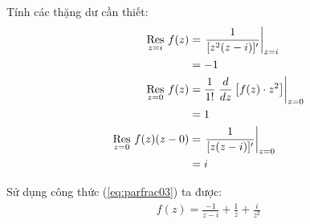 	Tính các thặng dư cần thiết:
	\begin{align*}
		\Res{f(z)}{z=i} &= \left.\frac{1}{[z^2(z-i)]'}\right\vert_{z=i} \\&= -1\\
		\Res{f(z)}{z=0} &= \frac{1}{1!} \left.\frac{d}{dz}\left[f(z)\cdot z^2\right]\right\vert_{z=0}\\&= 1\\
		\Res{f(z)(z-0)}{z=0} &= \left.\frac{1}{[z(z-i)]'}\right\vert_{z=0} \\&= i
	\end{align*}

	Sử dụng công thức (\ref{eq:parfrac03}) ta được:
	\begin{align*}
		f(z) = \frac{-1}{z-i} + \frac{1}{z} + \frac{i}{z^2}
	\end{align*}